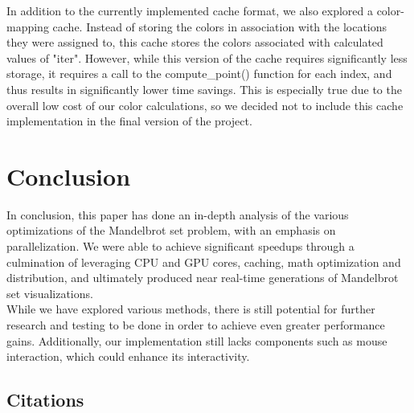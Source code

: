 \documentclass{article}
\begin{document}
In addition to the currently implemented cache format, we also explored a color-mapping cache.
Instead of storing the colors in association with the locations they were assigned to, this cache stores the colors associated with calculated values of "iter".
However, while this version of the cache requires significantly less storage, it requires a call to the compute\_point() function for each index, and thus results in significantly lower time savings.
This is especially true due to the overall low cost of our color calculations, so we decided not to include this cache implementation in the final version of the project.

\section{Conclusion}

In conclusion, this paper has done an in-depth analysis of the various optimizations of the Mandelbrot set problem, with an emphasis on parallelization.
We were able to achieve significant speedups through a culmination of leveraging CPU and GPU cores, caching, math optimization and distribution, and ultimately produced near real-time generations of Mandelbrot set visualizations.\\

While we have explored various methods, there is still potential for further research and testing to be done in order to achieve even greater performance gains.
Additionally, our implementation still lacks components such as mouse interaction, which could enhance its interactivity.

\pagebreak

\begin{center}

\section*{Citations}

\end{center}
\end{document}
